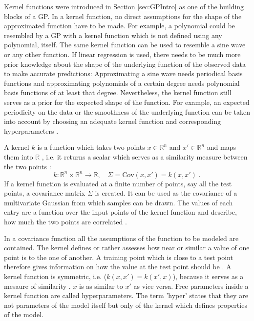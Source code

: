 \documentclass[%
  a4paper,oneside,%
  11pt,%
  smallchapters,
  style=printdev,
  extramargin,
  green,%
  rgb, <cmyk>
  ]{tubsbook}
\begin{document}
 
Kernel functions were introduced in Section \ref{sec:GPIntro} as one of the building blocks of a GP. 
In a kernel function, no direct assumptions for the shape of the approximated function have to be made. For example, a polynomial could be resembled by a GP with a kernel function which is not defined using any polynomial, itself. The same kernel function can be used to resemble a sine wave or any other function. If linear regression is used, there needs to be much more prior knowledge about the shape of the underlying function of the observed data to make accurate predictions: Approximating a sine wave needs periodical basis functions and approximating polynomials of a certain degree needs polynomial basis functions of at least that degree. Nevertheless, the kernel function still serves as a prior for the expected shape of the function. For example, an expected periodicity on the data or the smoothness of the underlying function can be taken into account by choosing an adequate kernel function and corresponding hyperparameters \cite{rasmussen2006}.

A kernel $k$ is a function which takes two points $x \in \mathbb{R}^n$ and $x' \in \mathbb{R}^n$ and maps them into $\mathbb{R}$ \cite[p.80]{rasmussen2006}, i.e. it returns a scalar which serves as a similarity measure between the two points \cite{gortler2019}:
%
\begin{equation}
k: \mathbb{R}^n \times \mathbb{R}^n \to \mathbb{R}, \quad \Sigma = \mathrm{Cov}(x,x') = k(x,x') \;.
\end{equation}
%
If a kernel function is evaluated at a finite number of points, say all the test points, a covariance matrix $\Sigma$ is created. It can be used as the covariance of a multivariate Gaussian from which samples can be drawn. The values of each entry are a function over the input points of the kernel function and describe, how much the two points are correlated \cite[p.14]{rasmussen2006}. 

In a covariance function all the assumptions of the function to be modeled are contained. The kernel defines or rather assesses how near or similar a value of one point is to the one of another. A training point which is close to a test point therefore gives information on how the value at the test point should be \cite[p.79]{rasmussen2006}. 
A kernel function is symmetric, i.e. ($k(x,x') = k(x',x)$), because it serves as a mesaure of similarity \cite[p.481]{murphy2012}. $x$ is as similar to $x'$ as vice versa.
Free parameters inside a kernel function are called hyperparameters. The term 'hyper' states that they are not parameters of the model itself but only of the kernel which defines properties of the model.
\end{document}
